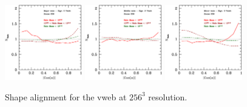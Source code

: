 \documentclass[usenatbib]{mn2e}
\begin{document}
\begin{figure}
\includegraphics[width=0.30\textwidth]{../plot2/Ax1_VT/256_AX1_V3.ps}
\includegraphics[width=0.30\textwidth]{../plot2/Ax2_VT/256_AX2_V2.ps}
\includegraphics[width=0.30\textwidth]{../plot2/Ax3_VT/256_AX3_V3.ps}
\caption{Shape alignment for the vweb at $256^3$ resolution.}
\end{figure}
\end{document}
